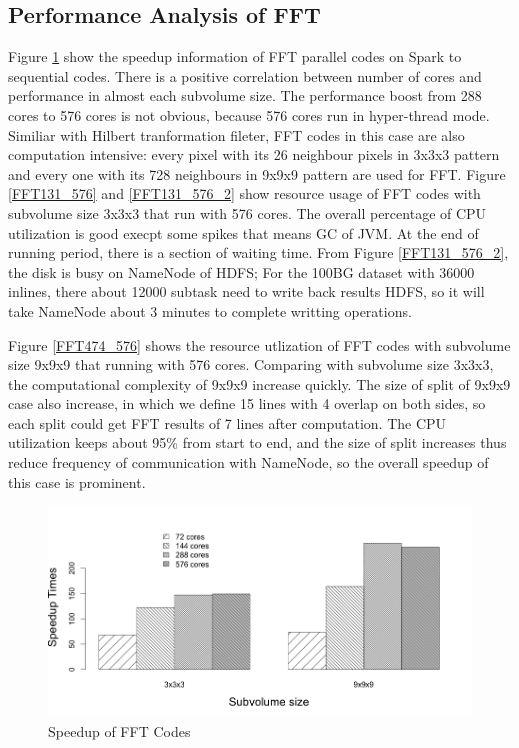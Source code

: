 \subsection{Performance Analysis of FFT}
Figure \ref{FFTSpeedup} show the speedup information of FFT parallel codes on Spark to sequential codes. There is a positive correlation between number of cores and performance in almost each subvolume size. The performance boost from 288 cores to 576 cores is not obvious, because 576 cores run in hyper-thread mode. Similiar with Hilbert tranformation fileter, FFT codes in this case are also computation intensive: every pixel with its 26 neighbour pixels in 3x3x3 pattern and every one with its 728 neighbours in 9x9x9 pattern are used for FFT. Figure \ref{FFT131_576} and \ref{FFT131_576_2} show resource usage of FFT codes with subvolume size 3x3x3 that run with 576 cores. The overall percentage of CPU utilization is good execpt some spikes that means GC of JVM. At the end of running period, there is a section of waiting time. From Figure \ref{FFT131_576_2}, the disk is busy on NameNode of HDFS; For the 100BG dataset with 36000 inlines, there about 12000 subtask need to write back results HDFS, so it will take NameNode about 3 minutes to complete writting operations.

Figure \ref{FFT474_576} shows the resource utlization of FFT codes with subvolume size 9x9x9 that running with 576 cores. Comparing with subvolume size 3x3x3, the computational complexity of 9x9x9 increase quickly. The size of split of 9x9x9 case also increase, in which we define 15 lines with 4 overlap on both sides, so each split could get FFT results of 7 lines after computation. The CPU utilization keeps about 95\% from start to end, and the size of split increases thus reduce frequency of communication with NameNode, so the overall speedup of this case is prominent. 

\begin{figure}[h]
\centering
\includegraphics[scale=.50]{figures/FFTSpeedup.png}
\caption{Speedup of FFT Codes}
\label{FFTSpeedup}
\end{figure}
 

